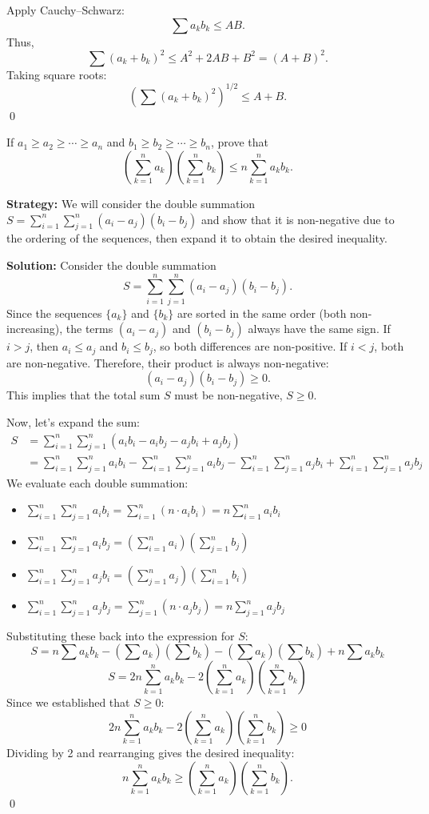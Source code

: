Apply Cauchy–Schwarz:
\[
\sum a_k b_k \leq A B.
\]
Thus,
\[
\sum (a_k + b_k)^2 \leq A^2 + 2AB + B^2 = (A + B)^2.
\]
Taking square roots:
\[
\left( \sum (a_k + b_k)^2 \right)^{1/2} \leq A + B.
\]\qed


\begin{problembox}
If \( a_1 \geq a_2 \geq \cdots \geq a_n \) and \( b_1 \geq b_2 \geq \cdots \geq b_n \), prove that
\[
\left( \sum_{k=1}^n a_k \right)\left( \sum_{k=1}^n b_k \right) \leq n \sum_{k=1}^n a_k b_k.
\]
\end{problembox}

\noindent\textbf{Strategy:} We will consider the double summation $S = \sum_{i=1}^n \sum_{j=1}^n (a_i - a_j)(b_i - b_j)$ and show that it is non-negative due to the ordering of the sequences, then expand it to obtain the desired inequality.

\bigskip\noindent\textbf{Solution:}
Consider the double summation
\[ S = \sum_{i=1}^n \sum_{j=1}^n (a_i - a_j)(b_i - b_j). \]
Since the sequences $\{a_k\}$ and $\{b_k\}$ are sorted in the same order (both non-increasing), the terms $(a_i - a_j)$ and $(b_i - b_j)$ always have the same sign. If $i>j$, then $a_i \le a_j$ and $b_i \le b_j$, so both differences are non-positive. If $i<j$, both are non-negative. Therefore, their product is always non-negative:
\[ (a_i - a_j)(b_i - b_j) \geq 0. \]
This implies that the total sum $S$ must be non-negative, $S \geq 0$.

Now, let's expand the sum:
\begin{align*}
S &= \sum_{i=1}^n \sum_{j=1}^n (a_i b_i - a_i b_j - a_j b_i + a_j b_j) \\
&= \sum_{i=1}^n \sum_{j=1}^n a_i b_i - \sum_{i=1}^n \sum_{j=1}^n a_i b_j - \sum_{i=1}^n \sum_{j=1}^n a_j b_i + \sum_{i=1}^n \sum_{j=1}^n a_j b_j
\end{align*}
We evaluate each double summation:
\begin{itemize}
\item \( \sum_{i=1}^n \sum_{j=1}^n a_i b_i = \sum_{i=1}^n \left( n \cdot a_i b_i \right) = n \sum_{i=1}^n a_i b_i \)
\item \( \sum_{i=1}^n \sum_{j=1}^n a_i b_j = \left( \sum_{i=1}^n a_i \right) \left( \sum_{j=1}^n b_j \right) \)
\item \( \sum_{i=1}^n \sum_{j=1}^n a_j b_i = \left( \sum_{j=1}^n a_j \right) \left( \sum_{i=1}^n b_i \right) \)
\item \( \sum_{i=1}^n \sum_{j=1}^n a_j b_j = \sum_{j=1}^n \left( n \cdot a_j b_j \right) = n \sum_{j=1}^n a_j b_j \)
\end{itemize}
Substituting these back into the expression for $S$:
\[
S = n \sum a_k b_k - \left(\sum a_k\right)\left(\sum b_k\right) - \left(\sum a_k\right)\left(\sum b_k\right) + n \sum a_k b_k
\]
\[
S = 2n \sum_{k=1}^n a_k b_k - 2 \left( \sum_{k=1}^n a_k \right) \left( \sum_{k=1}^n b_k \right)
\]
Since we established that $S \geq 0$:
\[
2n \sum_{k=1}^n a_k b_k - 2 \left( \sum_{k=1}^n a_k \right) \left( \sum_{k=1}^n b_k \right) \geq 0
\]
Dividing by 2 and rearranging gives the desired inequality:
\[
n \sum_{k=1}^n a_k b_k \geq \left( \sum_{k=1}^n a_k \right) \left( \sum_{k=1}^n b_k \right).
\]\qed

